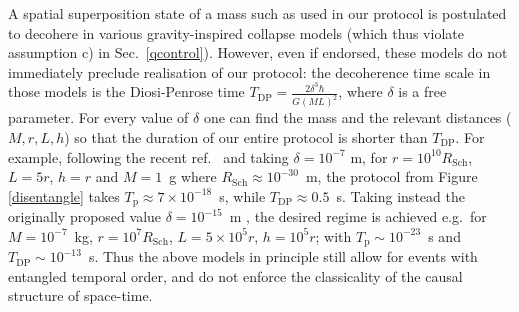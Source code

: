 \documentclass[a4paper,11pt]{article}
\begin{document}
A  spatial superposition state of a mass such as used in our protocol is postulated to decohere in various gravity-inspired collapse models %
\cite{ref:Karolyhazy1966, ref:Diosi1989, ref:Penrose1996, Stamp:2012, Penrose2014} (which thus violate assumption c) in Sec.~\ref{qcontrol}). %
However, even if endorsed, these models do not {immediately} preclude realisation of our protocol: the decoherence time scale in those models is the Diosi-Penrose time \cite{ref:Diosi1989, ref:Penrose1996} $T_\mathrm{DP}=\frac{2 \delta^3 \hbar}{G (ML)^2}$, where $\delta$ is a free parameter. For every value of $\delta$ one can find the mass and the relevant distances ($M, r, L, h$) so that the duration of our entire protocol is shorter than $T_\mathrm{DP}$. For example, following the recent ref.~\cite{Bahrami:2014_PRA} and taking $\delta=10^{-7}$ m, for
$r=10^{10} R_\mathrm{Sch}$, $L=5 r$, $h=r$ and $M=1$~g where $R_\mathrm{Sch}\approx 10^{-30}$~m, the protocol from  Figure \ref{disentangle}  takes $T_\mathrm{p}\approx7\times10^{-18}$~s, while $T_\mathrm{DP}\approx0.5$~s. Taking instead the originally proposed value $\delta=10^{-15}$~m \cite{ref:Diosi1989}, the desired regime is achieved e.g.~for $M=10^{-7}$~kg, $r=10^7 R_\mathrm{Sch}$, $L=5\times10^5r$, $h=10^5r$; with $T_\mathrm{p}\sim10^{-23}$~s and $T_\mathrm{DP}\sim10^{-13}$~s.
Thus the above models in principle still  allow for events with entangled temporal order, and do not enforce the classicality of the causal structure of space-time.


%
%
\end{document}
